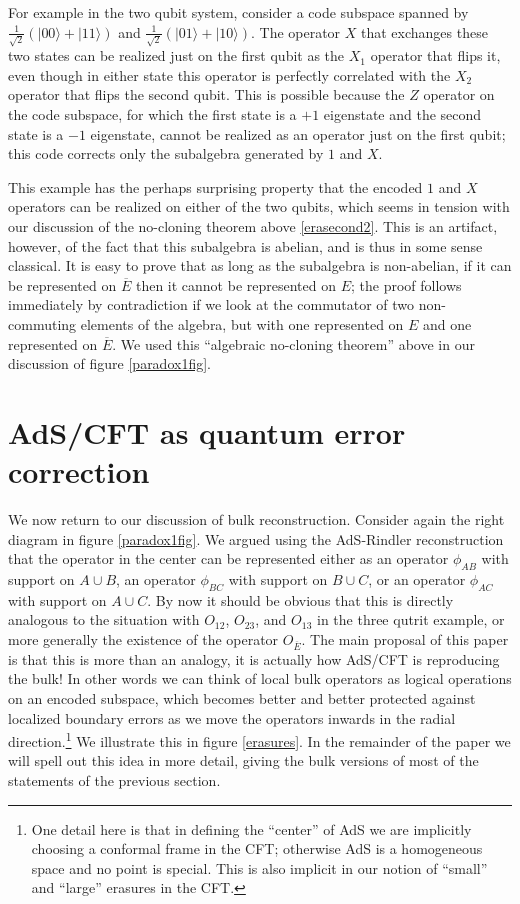 \documentclass[11pt]{article}
\newcommand{\ran}{\rangle}
\newcommand{\ol}{\overline}
\begin{document}
For example in the two qubit system, consider a code subspace spanned by $\frac{1}{\sqrt{2}}\left(|00\ran+|11\ran\right)$ and $\frac{1}{\sqrt{2}}\left(|01\ran+|10\ran\right)$.  The operator $X$ that exchanges these two states can be realized just on the first qubit as the $X_1$ operator that flips it, even though in either state this operator is perfectly correlated with the $X_2$ operator that flips the second qubit.  This is possible because the $Z$ operator on the code subspace, for which the first state is a $+1$ eigenstate and the second state is a $-1$ eigenstate, cannot be realized as an operator just on the first qubit; this code corrects only the subalgebra generated by $1$ and $X$.  

This example has the perhaps surprising property that the encoded $1$ and $X$ operators can be realized on either of the two qubits, which seems in tension with our discussion of the no-cloning theorem above \eqref{erasecond2}.  This is an artifact, however, of the fact that this subalgebra is abelian, and is thus in some sense classical.  It is easy to prove that as long as the subalgebra is non-abelian, if it can be represented on $\ol{E}$ then it cannot be represented on $E$; the proof follows immediately by contradiction if we look at the commutator of two non-commuting elements of the algebra, but with one represented on $E$ and one represented on $\ol{E}$.  We used this ``algebraic no-cloning theorem'' above in our discussion of figure \ref{paradox1fig}.

\section{AdS/CFT as quantum error correction}\label{adssec}

We now return to our discussion of bulk reconstruction.  Consider again the right diagram in figure \ref{paradox1fig}.  We argued using the AdS-Rindler reconstruction that the operator in the center can be represented either as an operator $\phi_{AB}$ with support on $A\cup B$, an operator $\phi_{BC}$ with support on $B\cup C$, or an operator $\phi_{AC}$ with support on $A \cup C$.  By now it should be obvious that this is directly analogous to the situation with $O_{12}$, $O_{23}$, and $O_{13}$ in the three qutrit example, or more generally the existence of the operator $O_{\ol{E}}$.  The main proposal of this paper is that this is more than an analogy, it is actually how AdS/CFT is reproducing the bulk!  In other words we can think of local bulk operators as logical operations on an encoded subspace, which becomes better and better protected against localized boundary errors as we move the operators inwards in the radial direction.\footnote{One detail here is that in defining the ``center'' of AdS we are implicitly choosing a conformal frame in the CFT; otherwise AdS is a homogeneous space and no point is special.  This is also implicit in our notion of ``small'' and ``large'' erasures in the CFT.}  We illustrate this in figure \ref{erasures}.  In the remainder of the paper we will spell out this idea in more detail, giving the bulk versions of most of the statements of the previous section.  
\end{document}
